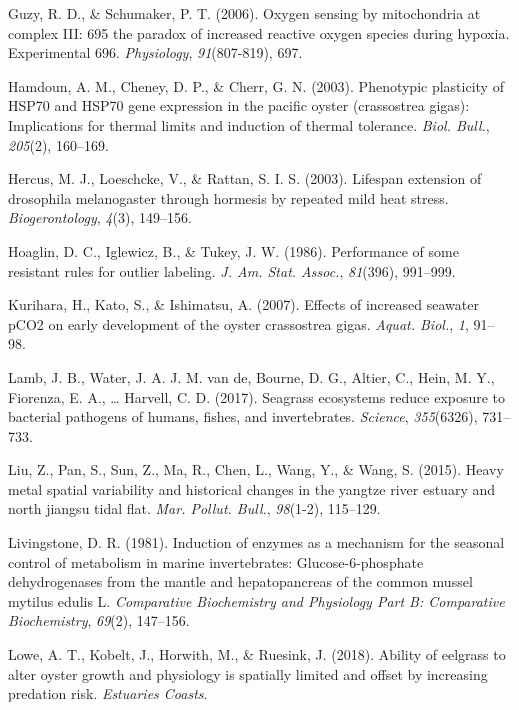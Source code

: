 \documentclass [11pt, proquest] {uwthesis}[2015/03/03]
\newlength{\cslhangindent}
\newenvironment{CSLReferences}%
{\setlength{\parindent}{0pt}%
\everypar{\setlength{\hangindent}{\cslhangindent}}\ignorespaces}%
{\par}
\begin{document}
\begin{CSLReferences}{1}{0}
\leavevmode\hypertarget{ref-Guzy2006}{}%
Guzy, R. D., \& Schumaker, P. T. (2006). Oxygen sensing by mitochondria at complex {III}: 695 the paradox of increased reactive oxygen species during hypoxia. Experimental 696. \emph{Physiology}, \emph{91}(807-819), 697.

\leavevmode\hypertarget{ref-Hamdoun2003}{}%
Hamdoun, A. M., Cheney, D. P., \& Cherr, G. N. (2003). Phenotypic plasticity of {HSP70} and {HSP70} gene expression in the pacific oyster (crassostrea gigas): Implications for thermal limits and induction of thermal tolerance. \emph{Biol. Bull.}, \emph{205}(2), 160--169.

\leavevmode\hypertarget{ref-Hercus2003}{}%
Hercus, M. J., Loeschcke, V., \& Rattan, S. I. S. (2003). Lifespan extension of drosophila melanogaster through hormesis by repeated mild heat stress. \emph{Biogerontology}, \emph{4}(3), 149--156.

\leavevmode\hypertarget{ref-Hoaglin1986}{}%
Hoaglin, D. C., Iglewicz, B., \& Tukey, J. W. (1986). Performance of some resistant rules for outlier labeling. \emph{J. Am. Stat. Assoc.}, \emph{81}(396), 991--999.

\leavevmode\hypertarget{ref-Kurihara2007}{}%
Kurihara, H., Kato, S., \& Ishimatsu, A. (2007). Effects of increased seawater {pCO2} on early development of the oyster crassostrea gigas. \emph{Aquat. Biol.}, \emph{1}, 91--98.

\leavevmode\hypertarget{ref-Lamb2017}{}%
Lamb, J. B., Water, J. A. J. M. van de, Bourne, D. G., Altier, C., Hein, M. Y., Fiorenza, E. A., \ldots{} Harvell, C. D. (2017). Seagrass ecosystems reduce exposure to bacterial pathogens of humans, fishes, and invertebrates. \emph{Science}, \emph{355}(6326), 731--733.

\leavevmode\hypertarget{ref-Liu2015}{}%
Liu, Z., Pan, S., Sun, Z., Ma, R., Chen, L., Wang, Y., \& Wang, S. (2015). Heavy metal spatial variability and historical changes in the yangtze river estuary and north jiangsu tidal flat. \emph{Mar. Pollut. Bull.}, \emph{98}(1-2), 115--129.

\leavevmode\hypertarget{ref-Livingstone1981}{}%
Livingstone, D. R. (1981). Induction of enzymes as a mechanism for the seasonal control of metabolism in marine invertebrates: Glucose-6-phosphate dehydrogenases from the mantle and hepatopancreas of the common mussel mytilus edulis {L}. \emph{Comparative Biochemistry and Physiology Part B: Comparative Biochemistry}, \emph{69}(2), 147--156.

\leavevmode\hypertarget{ref-Lowe2018}{}%
Lowe, A. T., Kobelt, J., Horwith, M., \& Ruesink, J. (2018). Ability of eelgrass to alter oyster growth and physiology is spatially limited and offset by increasing predation risk. \emph{Estuaries Coasts}.


\end{CSLReferences}
\end{document}
